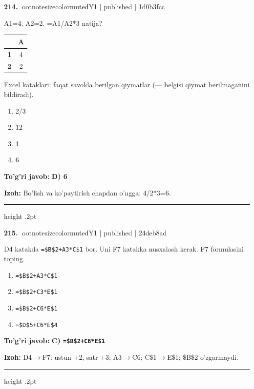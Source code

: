 \documentclass[10pt,a4paper]{article}
\begin{document}
\textbf{\color{ink}214.} {ootnotesizecolor{muted}Y1 | published | 1d0b3fcc}
\par
A1=4, A2=2. =A1/A2*3 natija?
\begin{center}\begingroup\small\setlength{\tabcolsep}{9pt}\renewcommand{\arraystretch}{1.28}
\begin{tabular}{|>{\columncolor{gray!12}}c|c|}
\hline
\rowcolor{gray!12} \textbf{} & \textbf{A}\\ \hline
\textbf{1} & 4\\ \hline
\textbf{2} & 2\\ \hline
\end{tabular}\endgroup\par{\footnotesize\color{muted}Excel kataklari: faqat savolda berilgan qiymatlar (--- belgisi qiymat berilmaganini bildiradi).}\end{center}
\begin{enumerate}[label=\Alph*),leftmargin=9mm]
\item 2/3
\item 12
\item 1
\item 6
\end{enumerate}
\begin{tcolorbox}[enhanced,breakable,colback=teal!4,colframe=teal!55!black,boxrule=0.45pt,arc=1.2mm,left=2.8mm,right=2.8mm,top=2mm,bottom=2mm]
\textbf{\color{teal}To'g'ri javob:} \textbf{D) 6}
\par\smallskip
\textbf{Izoh:} Bo'lish va ko'paytirish chapdan o'ngga: 4/2*3=6.
\end{tcolorbox}
\vspace{2mm}\hrule height .2pt\vspace{2mm}

\textbf{\color{ink}215.} {ootnotesizecolor{muted}Y1 | published | 24deb8ad}
\par
D4 katakda \texttt{=\$B\$2+A3*C\$1} bor. Uni F7 katakka nusxalash kerak. F7 formulasini toping.
\begin{enumerate}[label=\Alph*),leftmargin=9mm]
\item \texttt{=\$B\$2+A3*C\$1}
\item \texttt{=\$B\$2+C3*E\$1}
\item \texttt{=\$B\$2+C6*E\$1}
\item \texttt{=\$D\$5+C6*E\$4}
\end{enumerate}
\begin{tcolorbox}[enhanced,breakable,colback=teal!4,colframe=teal!55!black,boxrule=0.45pt,arc=1.2mm,left=2.8mm,right=2.8mm,top=2mm,bottom=2mm]
\textbf{\color{teal}To'g'ri javob:} \textbf{C) \texttt{=\$B\$2+C6*E\$1}}
\par\smallskip
\textbf{Izoh:} D4\ensuremath{\rightarrow}F7: ustun +2, satr +3; A3\ensuremath{\rightarrow}C6; C\$1\ensuremath{\rightarrow}E\$1; \$B\$2 o'zgarmaydi.
\end{tcolorbox}
\vspace{2mm}\hrule height .2pt\vspace{2mm}
\end{document}
